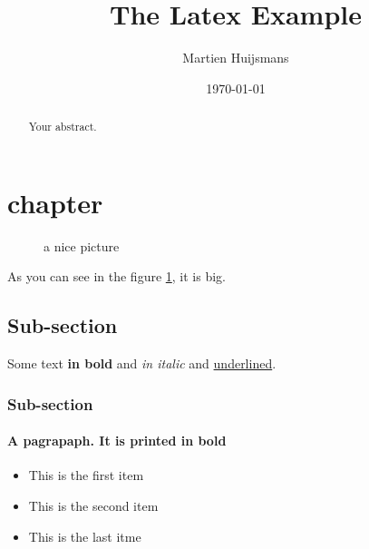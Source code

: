 \documentclass[a4paper]{article}
\author{Martien Huijsmans}
\title{The Latex Example}
\date{\today}
\begin{document}
\maketitle
\tableofcontents

\begin{abstract}
Your abstract.
\end{abstract}

\newpage

\section{chapter}

\begin{figure}[h!]
    \centering
    \caption{a nice picture}
    \label{fig:universe1}
\end{figure}
As you can see in the figure \ref{fig:universe1}, it is big.

\subsection{Sub-section}

Some text \textbf{in bold} and \textit{in italic} and \underline{underlined}.

\subsubsection{Sub-section}

\paragraph{A pagrapaph. It is printed in bold}
\begin{itemize}
\item This is the first item
\item This is the second item
\item This is the last itme
\end{itemize}
\end{document}
